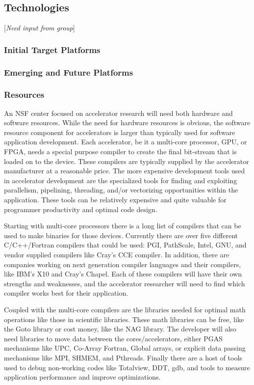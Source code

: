 \subsection{Technologies} [\textit{Need input from group}]
\subsubsection{Initial Target Platforms}

\subsubsection{Emerging and Future Platforms}


\subsubsection{Resources}
An NSF center focused on accelerator research will need both hardware and software resources. While the need for hardware resources is obvious, the software resource component for accelerators is larger
than typically used for software application development. Each accelerator, be it a multi-core processor, GPU, or FPGA, needs a special purpose compiler to create the final bit-stream that is loaded on to the device. These compilers are typically supplied by the accelerator manufacturer at a reasonable price. The more expensive development tools used in accelerator development are the specialized tools for finding and exploiting parallelism, pipelining, threading, and/or vectorizing opportunities within the application. These tools can be relatively expensive and quite valuable for programmer productivity and optimal code design.

Starting with multi-core processors there is a long list of compilers that can be used to make binaries for those devices. Currently there are over five different C/C++/Fortran compilers that could be used: PGI, PathScale, Intel, GNU, and vendor supplied compilers like Cray's CCE compiler. In addition, there are companies working on next generation compiler languages and their compilers, like IBM's X10 and Cray's Chapel. Each of these compilers will have their own strengths and weaknesses, and the accelerator researcher will need to find which compiler works best for their application.

Coupled with the multi-core compilers are the libraries needed for optimal math operations like those in scientific libraries. These math libraries can be free, like the Goto library or cost money, like the NAG library. The developer will also need libraries to move data between the cores/accelerators, either PGAS mechanisms like UPC, Co-Array Fortran, Global arrays, or explicit data passing mechanisms like MPI, SHMEM, and Pthreads. Finally there are a host of tools used to debug non-working codes like Totalview, DDT, gdb, and tools to measure application performance and improve optimizations.

